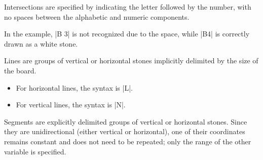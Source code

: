 \begin{goban}[9, stone = {radius = 4pt}, mark = {line = {color = red}}]

Intersections are specified by indicating the letter followed by the number, with no spaces between the alphabetic and numeric components.

\begin{codeexample}[]
	
	\begin{goban}[label = {at = {south, west}}]
	\end{goban}
\end{codeexample}

In the example, |B 3| is not recognized due to the space, while |B4| is correctly drawn as a white stone.



Lines are groups of vertical or horizontal stones implicitly delimited by the size of the board.

\begin{itemize}
	\item For horizontal lines, the syntax is |L|.
	\item For vertical lines, the syntax is |N|.
\end{itemize}

\begin{codeexample}[width=6cm]
	
	\begin{goban}
	\end{goban}
	
	\begin{goban}
		\stones[b]{B2,C2,D2}
		\stones[fill = {color = blue}]{4}
	\end{goban}
	
	\begin{goban}
	\end{goban}
\end{codeexample}



Segments are explicitly delimited groups of vertical or horizontal stones. Since they are unidirectional (either vertical or horizontal), one of their coordinates remains constant and does not need to be repeated; only the range of the other variable is specified.


\end{goban}
